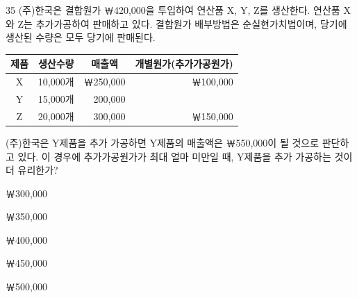 \begin{question}{35}
(주)한국은 결합원가 ￦420,000을 투입하여 연산품 X, Y, Z를 생산한다. 연산품 X와 Z는 추가가공하여 판매하고 있다. 결합원가 배부방법은 순실현가치법이며, 당기에 생산된 수량은 모두 당기에 판매된다.

{\small\centering
\begin{tabular}{@{}c r r r@{}}
\hline
제품 & \multicolumn{1}{c}{생산수량} & \multicolumn{1}{c}{매출액} & \multicolumn{1}{c}{개별원가(추가가공원가)} \\
\hline
X & 10,000개 & ￦250,000 & ￦100,000 \\
Y & 15,000개 & 200,000 & \\
Z & 20,000개 & 300,000 & ￦150,000 \\
\hline
\end{tabular}\par}
(주)한국은 Y제품을 추가 가공하면 Y제품의 매출액은 ￦550,000이 될 것으로 판단하고 있다. 이 경우에 추가가공원가가 최대 얼마 미만일 때, Y제품을 추가 가공하는 것이 더 유리한가? \par
\begin{choices}
  \item ￦300,000
  \item ￦350,000
  \item ￦400,000
  \item ￦450,000
  \item ￦500,000
\end{choices}
\end{question}
